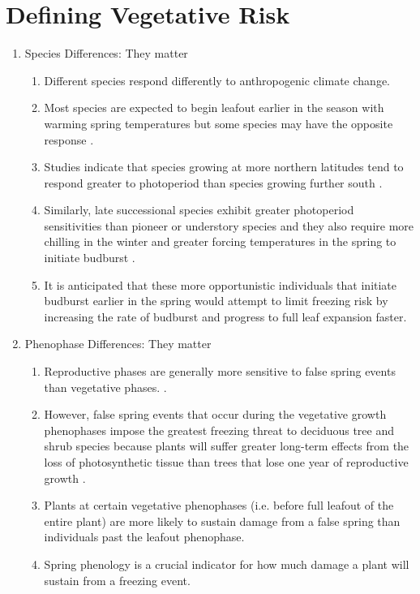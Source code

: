 \documentclass{article}\usepackage[]{graphicx}\usepackage[]{color}
\begin{document}
\section*{Defining Vegetative Risk} %
\begin{enumerate}
\item Species Differences: They matter 
\begin {enumerate}
\item Different species respond differently to anthropogenic climate change.
\item Most species are expected to begin leafout earlier in the season with warming spring temperatures but some species may have the opposite response \citep{Cleland2006, Yu2010, Xin2016}.
\item Studies indicate that species growing at more northern latitudes tend to respond greater to photoperiod than species growing further south \citep {Partanen2004, Viheraaarnio2006, Caffarra2011}.
\item Similarly, late successional species exhibit greater photoperiod sensitivities than pioneer or understory species \citep{Basler2012} and they also require more chilling in the winter and greater forcing temperatures in the spring to initiate budburst \citep{Laube2013}.
\item It is anticipated that these more opportunistic individuals that initiate budburst earlier in the spring would attempt to limit freezing risk by increasing the rate of budburst and progress to full leaf expansion faster.
\end{enumerate}

\item Phenophase Differences: They matter 
\begin {enumerate}
\item Reproductive phases are generally more sensitive to false spring events than vegetative phases. \citep{Augspurger2009, Lenz2013}.
\item However, false spring events that occur during the vegetative growth phenophases impose the greatest freezing threat to deciduous tree and shrub species because plants will suffer greater long-term effects from the loss of photosynthetic tissue than trees that lose one year of reproductive growth \citep{Sakai1987}.
\item Plants at certain vegetative phenophases (i.e. before full leafout of the entire plant) are more likely to sustain damage from a false spring than individuals past the leafout phenophase. 
\item Spring phenology is a crucial indicator for how much damage a plant will sustain from a freezing event.
\end {enumerate}


\end{enumerate}
\end{document}
